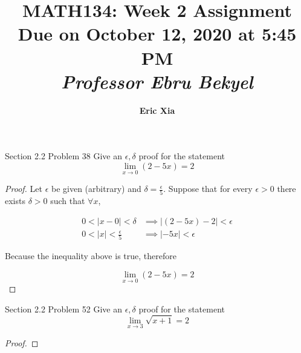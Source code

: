 \documentclass{article}
\title{
    \vspace{2in}
    \textmd{\textbf{MATH134: Week 2 Assignment}}\\
    \normalsize\vspace{0.1in}\small{Due on October 12, 2020 at 5:45 PM}\\
    \vspace{0.1in}\large{\textit{Professor Ebru Bekyel}}
    \vspace{3in}
}
\author{\textbf{Eric Xia}}
\date{}
\begin{document}
    \maketitle
    \pagebreak


    \thispagestyle{page2}

    \begin{tbhtheorem}{Section 2.2 Problem 38}
        Give an $\epsilon,\delta$ proof for the statement
        \[
            \lim_{x\to 0} (2-5x) = 2
        \]
    \end{tbhtheorem}

    \begin{proof}
        Let $\epsilon$ be given (arbitrary) and $\delta=\frac{\epsilon}{5}$. Suppose that for every $\epsilon>0$ there exists $\delta >0$ such that $\forall x$,

        \begin{align*}
            0 < |x-0| < \delta           & \implies |(2-5x)-2|<\epsilon \\
            0 < |x| < \frac{\epsilon}{5} & \implies |-5x| < \epsilon
        \end{align*}

        Because the inequality above is true, therefore

        \[
            \lim_{x\to 0} (2-5x) = 2
        \]
    \end{proof}


    \begin{tbhtheorem}{Section 2.2 Problem 52}
        Give an $\epsilon,\delta$ proof for the statement
        \[
            \lim_{x\to 3} \sqrt{x+1} = 2
        \]
    \end{tbhtheorem}

    \begin{proof}

    \end{proof}
\end{document}
